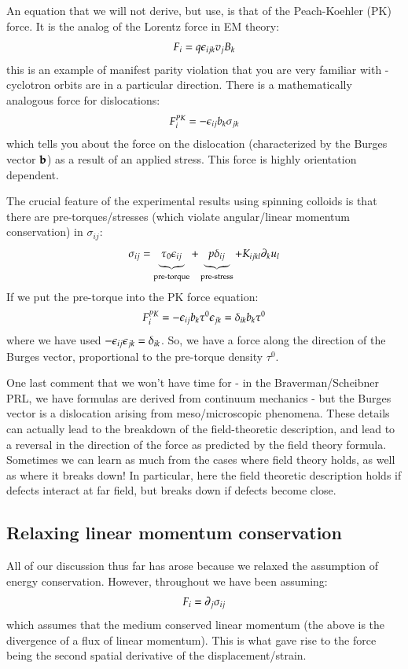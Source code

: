 An equation that we will not derive, but use, is that of the Peach-Koehler (PK) force. It is the analog of the Lorentz force in EM theory:
\begin{equation}
    F_i = q\epsilon_{ijk}v_jB_k
\end{equation}
this is an example of manifest parity violation that you are very familiar with - cyclotron orbits are in a particular direction. There is a mathematically analogous force for dislocations:
\begin{equation}
    F_i^{PK} = -\epsilon_{ij}b_k\sigma_{jk}
\end{equation}
which tells you about the force on the dislocation (characterized by the Burges vector $\mathbf{b}$) as a result of an applied stress. This force is highly orientation dependent.

The crucial feature of the experimental results using spinning colloids is that there are pre-torques/stresses (which violate angular/linear momentum conservation) in $\sigma_{ij}$:
\begin{equation}
    \sigma_{ij} = \underbrace{\tau_0 \epsilon_{ij}}_{\text{pre-torque}} + \underbrace{p\delta_{ij}}_{\text{pre-stress}} + K_{ijkl}\partial_k u_l
\end{equation}
If we put the pre-torque into the PK force equation:
\begin{equation}
    F_i^{PK} = -\epsilon_{ij}b_k\tau^0\epsilon_{jk} = \delta_{ik}b_k\tau^0
\end{equation}
where we have used $-\epsilon_{ij}\epsilon_{jk} = \delta_{ik}$. So, we have a force along the direction of the Burges vector, proportional to the pre-torque density $\tau^0$.

One last comment that we won't have time for - in the Braverman/Scheibner PRL, we have formulas are derived from continuum mechanics - but the Burges vector is a dislocation arising from meso/microscopic phenomena. These details can actually lead to the breakdown of the field-theoretic description, and lead to a reversal in the direction of the force as predicted by the field theory formula. Sometimes we can learn as much from the cases where field theory holds, as well as where it breaks down! In particular, here the field theoretic description holds if defects interact at far field, but breaks down if defects become close.

\subsection{Relaxing linear momentum conservation}
All of our discussion thus far has arose because we relaxed the assumption of energy conservation. However, throughout we have been assuming:
\begin{equation}
    F_i = \partial_j \sigma_{ij}
\end{equation}
which assumes that the medium conserved linear momentum (the above is the divergence of a flux of linear momentum). This is what gave rise to the force being the second spatial derivative of the displacement/strain.

